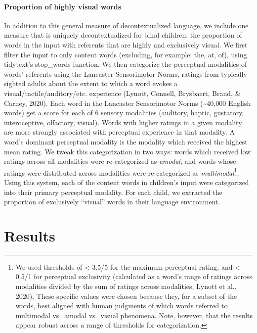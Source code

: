 \documentclass[
  man]{apa6}
\let\oldparagraph\paragraph
\renewcommand{\paragraph}[1]{\oldparagraph{#1}\mbox{}}
\begin{document}
\hypertarget{proportion-of-highly-visual-words}{%
\paragraph{Proportion of highly visual words}\label{proportion-of-highly-visual-words}}

In addition to this general measure of decontextualized language, we include one measure that is uniquely decontextualized for blind children: the proportion of words in the input with referents that are highly and exclusively visual. We first filter the input to only content words (excluding, for example: the, at, of), using tidytext's stop\_words function. We then categorize the perceptual modalities of words' referents using the Lancaster Sensorimotor Norms, ratings from typically-sighted adults about the extent to which a word evokes a visual/tactile/auditory/etc. experience (Lynott, Connell, Brysbaert, Brand, \& Carney, 2020). Each word in the Lancaster Sensorimotor Norms
(\textasciitilde40,000 English words) get a score for each of 6 sensory modalities (auditory, haptic, gustatory, interoceptive, olfactory, visual). Words with higher ratings in a given modality are more strongly associated with perceptual experience in that modality. A word's dominant perceptual modality is the modality which received the highest mean rating. We tweak this categorization in two ways: words which received low ratings across all modalities were re-categorized as \emph{amodal}, and words whose ratings were distributed across modalities were re-categorized as \emph{multimodal}\footnote{We used thresholds of \textless{} 3.5/5 for the maximum perceptual rating, and \textless{} 0.5/1 for perceptual exclusivity (calculated as a word's range of ratings across modalities divided by the sum of ratings across modalities, Lynott et al., 2020). These specific values were chosen because they, for a subset of the words, best aligned with human judgments of which words referred to multimodal vs.~amodal vs.~visual phenomena. Note, however, that the results appear robust across a range of thresholds for categorization.}. Using this system, each of the content words in children's input were categorized into their primary perceptual modality. For each child, we extracted the proportion of exclusively ``visual'' words in their language environment.

\hypertarget{results}{%
\section{Results}\label{results}}
\end{document}

